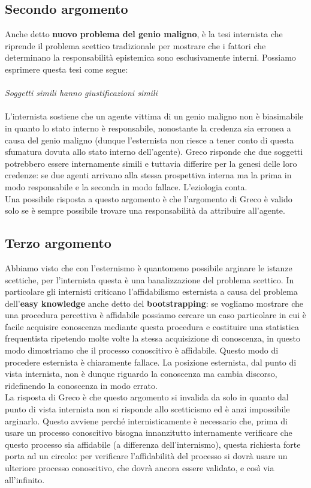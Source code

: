 \documentclass[10pt,a4paper]{article}
\begin{document}
\subsection{Secondo argomento}
Anche detto \textbf{nuovo problema del genio maligno}, è la tesi internista che riprende il problema scettico tradizionale per mostrare che i fattori che determinano la responsabilità epistemica sono esclusivamente interni. Possiamo esprimere questa tesi come segue:\\\\
\textit{Soggetti simili hanno giustificazioni simili}\\\\
L'internista sostiene che un agente vittima di un genio maligno non è biasimabile in quanto lo stato interno è responsabile, nonostante la credenza sia erronea a causa del genio maligno (dunque l'esternista non riesce a tener conto di questa sfumatura dovuta allo stato interno dell'agente). Greco risponde che due soggetti potrebbero essere internamente simili e tuttavia differire per la genesi delle loro credenze: se due agenti arrivano alla stessa prospettiva interna ma la prima in modo responsabile e la seconda in modo fallace. L'eziologia conta.\\
Una possibile risposta a questo argomento è che l'argomento di Greco è valido solo se è sempre possibile trovare una responsabilità da attribuire all'agente.
\subsection{Terzo argomento}
Abbiamo visto che con l'esternismo è quantomeno possibile arginare le istanze scettiche, per l'internista questa è una banalizzazione del problema scettico. In particolare gli internisti criticano l'affidabilismo esternista a causa del problema dell'\textbf{easy knowledge} anche detto del \textbf{bootstrapping}: se vogliamo mostrare che una procedura percettiva è affidabile possiamo cercare un caso particolare in cui è facile acquisire conoscenza mediante questa procedura e costituire una statistica frequentista ripetendo molte volte la stessa acquisizione di conoscenza, in questo modo dimostriamo che il processo conoscitivo è affidabile. Questo modo di procedere esternista è chiaramente fallace. La posizione esternista, dal punto di vista internista, non è dunque riguardo la conoscenza ma cambia discorso, ridefinendo la conoscenza in modo errato.\\
La risposta di Greco è che questo argomento si invalida da solo in quanto dal punto di vista internista non si risponde allo scetticismo ed è anzi impossibile arginarlo. Questo avviene perché internisticamente è necessario che, prima di usare un processo conoscitivo bisogna innanzitutto internamente verificare che questo processo sia affidabile (a differenza dell'internismo), questa richiesta forte porta ad un circolo: per verificare l'affidabilità del processo si dovrà usare un ulteriore processo conoscitivo, che dovrà ancora essere validato, e così via all'infinito.
\end{document}
